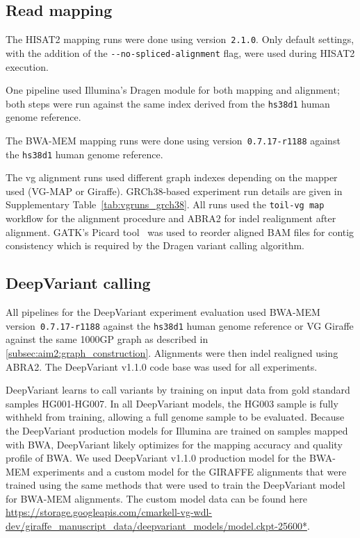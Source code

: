 \documentclass[11pt]{ucscthesis}
\begin{document}
\subsection{Read mapping}
The HISAT2 mapping runs were done using version~\texttt{2.1.0}.
Only default settings, with the addition of the \texttt{-{}-no-spliced-alignment} flag, were used during HISAT2 execution.

One pipeline used Illumina's Dragen module for both mapping and alignment; both steps were run against the same index derived from the \texttt{hs38d1} human genome reference.

The BWA-MEM mapping runs were done using version~\texttt{0.7.17-r1188} against the \texttt{hs38d1} human genome reference.

The vg alignment runs used different graph indexes depending on the mapper used (VG-MAP or Giraffe).
GRCh38-based experiment run details are given in Supplementary Table~\ref{tab:vgruns_grch38}.
All runs used the \texttt{toil-vg~map} workflow for the alignment procedure and ABRA2\cite{mose2019improved} for indel realignment after alignment.
GATK's Picard tool~\cite{Picard2019toolkit} was used to reorder aligned BAM files for contig consistency which is required by the Dragen variant calling algorithm.

\subsection{DeepVariant calling}
\label{subsec:aim2:deepvariant_calling}

All pipelines for the DeepVariant experiment evaluation used BWA-MEM version~\texttt{0.7.17-r1188} against the \texttt{hs38d1} human genome reference or VG Giraffe against the same 1000GP graph as described in \ref{subsec:aim2:graph_construction}.
Alignments were then indel realigned using ABRA2\cite{mose2019improved}.
The DeepVariant v1.1.0 code base was used for all experiments.

DeepVariant learns to call variants by training on input data from gold standard samples HG001-HG007.
In all DeepVariant models, the HG003 sample is fully withheld from training, allowing a full genome sample to be evaluated.
Because the DeepVariant production models for Illumina are trained on samples mapped with BWA, DeepVariant likely optimizes for the mapping accuracy and quality profile of BWA.
We used DeepVariant v1.1.0 production model for the BWA-MEM experiments and a custom model for the GIRAFFE alignments that were trained using the same methods that were used to train the DeepVariant model for BWA-MEM alignments.
The custom model data can be found here \url{https://storage.googleapis.com/cmarkell-vg-wdl-dev/giraffe_manuscript_data/deepvariant_models/model.ckpt-25600*}.
\end{document}
